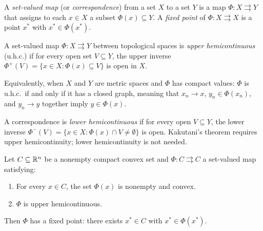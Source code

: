 \documentclass[11pt,a4paper]{article}
\begin{document}
\begin{definition}
\label{def:correspondence}
A \emph{set-valued map} (or \emph{correspondence}) from a set $X$ to
a set $Y$ is a map $\Phi \colon X \rightrightarrows Y$ that assigns
to each $x \in X$ a subset $\Phi(x) \subseteq Y$.  A \emph{fixed
point} of $\Phi \colon X \rightrightarrows X$ is a point $x^*$ with
$x^* \in \Phi(x^*)$.
\end{definition}

\begin{definition}
\label{def:uhc}
A set-valued map $\Phi \colon X \rightrightarrows Y$ between
topological spaces is \emph{upper hemicontinuous} (u.h.c.) if for
every open set $V \subseteq Y$, the upper inverse
$\Phi^+(V) = \{x \in X : \Phi(x) \subseteq V\}$ is open in $X$.

Equivalently, when $X$ and $Y$ are metric spaces and $\Phi$ has
compact values: $\Phi$ is u.h.c.\ if and only if it has a closed
graph, meaning that $x_n \to x$, $y_n \in \Phi(x_n)$, and
$y_n \to y$ together imply $y \in \Phi(x)$.
\end{definition}

\begin{remark}
\label{rem:lhc}
A correspondence is \emph{lower hemicontinuous} if for every open
$V \subseteq Y$, the lower inverse
$\Phi^-(V) = \{x \in X : \Phi(x) \cap V \neq \emptyset\}$ is open.
Kakutani's theorem requires upper hemicontinuity; lower
hemicontinuity is not needed.
\end{remark}

\begin{theorem}
\label{thm:kakutani}
Let $C \subseteq \mathbb{R}^n$ be a nonempty compact convex set and
$\Phi \colon C \rightrightarrows C$ a set-valued map satisfying:
\begin{enumerate}[label=(\roman*)]
    \item For every $x \in C$, the set $\Phi(x)$ is nonempty and
          convex.
    \item $\Phi$ is upper hemicontinuous.
\end{enumerate}
Then $\Phi$ has a fixed point: there exists $x^* \in C$ with
$x^* \in \Phi(x^*)$.
\end{theorem}
\end{document}

